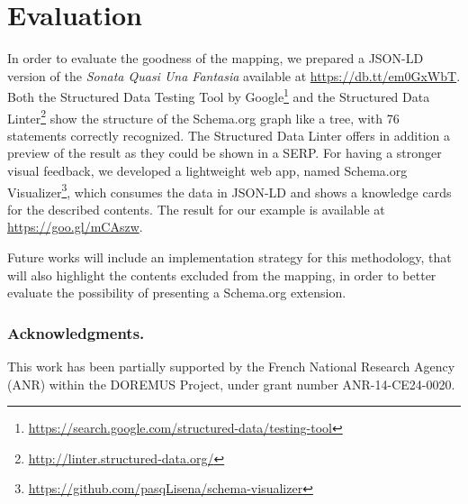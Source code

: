 \documentclass{llncs}
\begin{document}

\section{Evaluation}
\label{sec:evaluation}

In order to evaluate the goodness of the mapping, we prepared a JSON-LD version of the \textit{Sonata Quasi Una Fantasia} available at \url{https://db.tt/em0GxWbT}.
Both the Structured Data Testing Tool by Google\footnote{\url{https://search.google.com/structured-data/testing-tool}} and the Structured Data Linter\footnote{\url{http://linter.structured-data.org/}} show the structure of the Schema.org graph like a tree, with 76 statements correctly recognized. The Structured Data Linter offers in addition a preview of the result as they could be shown in a SERP.
For having a stronger visual feedback, we developed a lightweight web app, named Schema.org Visualizer\footnote{\url{https://github.com/pasqLisena/schema-visualizer}}, which consumes the data in JSON-LD and shows a knowledge cards for the described contents. The result for our example is available at \url{https://goo.gl/mCAszw}.

Future works will include an implementation strategy for this methodology, that will also highlight the contents excluded from the mapping, in order to better evaluate the possibility of presenting a Schema.org extension.





\subsubsection*{Acknowledgments.}
This work has been partially supported by the French National Research Agency (ANR) within the DOREMUS Project, under grant number ANR-14-CE24-0020.




\newpage
\end{document}
